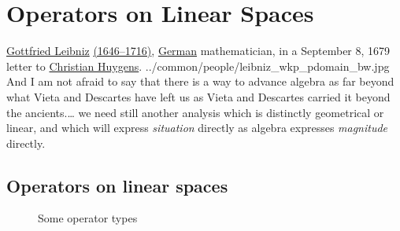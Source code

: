 ﻿%

\chapter{Operators on Linear Spaces}
\label{chp:operator}
\qboxnps
  {\href{http://en.wikipedia.org/wiki/Gottfried_Leibniz}{Gottfried Leibniz}
   \href{http://www-history.mcs.st-andrews.ac.uk/Timelines/TimelineC.html}{(1646--1716)},
   \href{http://www-history.mcs.st-andrews.ac.uk/BirthplaceMaps/Places/Germany.html}{German} mathematician,
   in a September 8, 1679 letter to
   \href{http://en.wikipedia.org/wiki/Christian_Huygens}{Christian Huygens}.
   \footnotemark
  }
  {../common/people/leibniz_wkp_pdomain_bw.jpg}
  {And I am not afraid to say that
   there is a way to advance algebra as far beyond what Vieta and Descartes have left us
   as Vieta and Descartes carried it beyond the ancients.\ldots
   we need still another analysis which is distinctly geometrical or linear,
   and which will express {\em situation} directly as algebra expresses {\em magnitude} directly.}




\section{Operators on linear spaces}
\begin{figure}[t]
  \begin{center}
  
  \caption{Some operator types\label{fig:operator_oplat}}
  \end{center}
\end{figure}%

